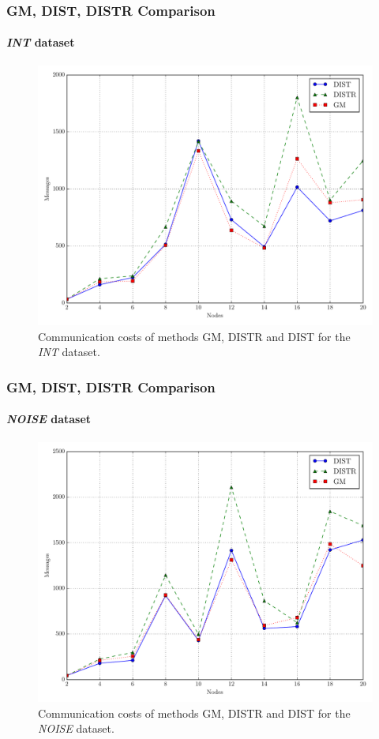 \documentclass[hyperref={pdfpagelabels=false}]{beamer}
\begin{document}
\begin{frame} \frametitle{GM, DIST, DISTR Comparison}\framesubtitle{\emph{INT} dataset}
\begin{figure}
\vspace{-0.5cm}
\centering
\includegraphics[scale=0.3]{../img/matching_msg_interweaving.pdf}
  \caption{Communication costs of methods GM, DISTR and DIST for the \emph{INT} dataset.}
\end{figure}
\end{frame}

\begin{frame} \frametitle{GM, DIST, DISTR Comparison}\framesubtitle{\emph{NOISE} dataset}
\begin{figure}
\vspace{-0.5cm}
\centering
\includegraphics[scale=0.3]{../img/matching_msg_noisyinterweaving.pdf}
  \caption{Communication costs of methods GM, DISTR and DIST for the \emph{NOISE} dataset.}
\end{figure}
\end{frame}
\end{document}
